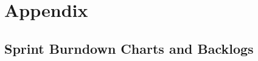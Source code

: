 \chapter*{Appendix}

\section{Sprint Burndown Charts and Backlogs}
\label{sec:burn_back}
	\begin{center}

	\end{center}